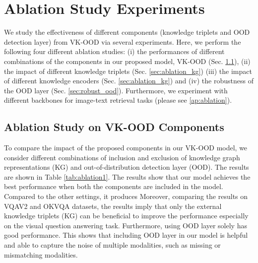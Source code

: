\documentclass{article}
\begin{document}
\section{Ablation Study Experiments}
We study the effectiveness of different components (knowledge triplets and OOD detection layer) from VK-OOD via several experiments. Here, we perform the following four different ablation studies: (i) the performances of different combinations of the components in our proposed model, VK-OOD (Sec. \ref{sec:ablation_vkood}), (ii) the impact of different knowledge triplets (Sec. \ref{sec:ablation_kg}) (iii) the impact of different knowledge encoders (Sec. \ref{sec:ablation_kg}) and (iv) the robustness of the OOD layer (Sec. \ref{sec:robust_ood}). Furthermore, we experiment with different backbones for image-text retrieval tasks (please see \ref{ap:ablation}).







\subsection{Ablation Study on VK-OOD Components}
\label{sec:ablation_vkood}
To compare the impact of the proposed components in our {VK-OOD} model, we consider different combinations of inclusion and exclusion of knowledge graph representations (KG) and out-of-distribution detection layer (OOD). The results are shown in Table \ref{tab:ablation1}. The results show that our model achieves the best performance when both the components are included in the model. Compared to the other settings, it produces Moreover, comparing the results on VQAV2 and OKVQA datasets, the results imply that only the external knowledge triplets (KG) can be beneficial to improve the performance especially on the visual question answering task. Furthermore, using OOD layer solely has good performance. This shows that including OOD layer in our model is helpful and able to capture the noise of multiple modalities, such as missing or mismatching modalities. 
\end{document}
